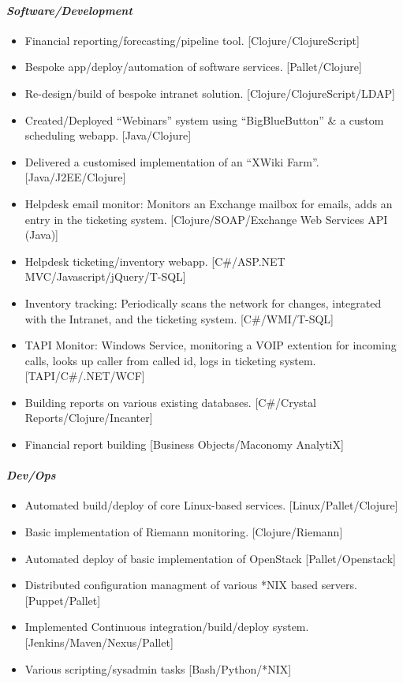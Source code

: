 \documentclass{article}
\begin{document}
\paragraph*{\emph{Software/Development}}
\begin{itemize}
\item Financial reporting/forecasting/pipeline tool.
             [Clojure/ClojureScript]
\item Bespoke app/deploy/automation of software services.
             [Pallet/Clojure]
\item Re-design/build of bespoke intranet solution.
             [Clojure/ClojureScript/LDAP]
\item Created/Deployed ``Webinars'' system using ``BigBlueButton'' \& a
             custom scheduling webapp. [Java/Clojure]
\item Delivered a customised implementation of an ``XWiki Farm''.
            [Java/J2EE/Clojure]
\item Helpdesk email monitor: Monitors an Exchange mailbox for emails,
            adds an entry in the ticketing system.
            [Clojure/SOAP/Exchange Web Services API (Java)]
\item Helpdesk ticketing/inventory webapp.
            [C\#/ASP.NET MVC/Javascript/jQuery/T-SQL]
\item Inventory tracking: Periodically scans the network for changes,
            integrated with the Intranet, and the ticketing system.
            [C\#/WMI/T-SQL]
\item TAPI Monitor: Windows Service, monitoring a VOIP extention for
            incoming calls, looks up caller from called id, logs in ticketing
            system. [TAPI/C\#/.NET/WCF]
\item Building reports on various existing databases.
            [C\#/Crystal Reports/Clojure/Incanter]
\item Financial report building [Business Objects/Maconomy AnalytiX]
\end{itemize}
\paragraph*{\emph{Dev/Ops}}
\begin{itemize}
\item Automated build/deploy of core Linux-based services.
             [Linux/Pallet/Clojure]
\item Basic implementation of Riemann monitoring. [Clojure/Riemann]
\item Automated deploy of basic implementation of OpenStack
             [Pallet/Openstack]
\item Distributed configuration managment of various *NIX based servers.
             [Puppet/Pallet]
\item Implemented Continuous integration/build/deploy system.
             [Jenkins/Maven/Nexus/Pallet]
\item Various scripting/sysadmin tasks [Bash/Python/*NIX]
\end{itemize}
\end{document}
